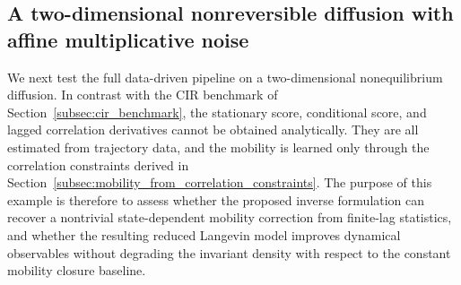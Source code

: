 \documentclass[11pt,twoside,fleqn]{article}
\begin{document}
\subsection{A two-dimensional nonreversible diffusion with affine multiplicative noise}
\label{subsec:affine_multiplicative_2d_results}

We next test the full data-driven pipeline on a two-dimensional nonequilibrium diffusion. In contrast with the CIR benchmark of Section~\ref{subsec:cir_benchmark}, the stationary score, conditional score, and lagged correlation derivatives cannot be obtained analytically. They are all estimated from trajectory data, and the mobility is learned only through the correlation constraints derived in Section~\ref{subsec:mobility_from_correlation_constraints}. The purpose of this example is therefore to assess whether the proposed inverse formulation can recover a nontrivial state-dependent mobility correction from finite-lag statistics, and whether the resulting reduced Langevin model improves dynamical observables without degrading the invariant density with respect to the constant mobility closure baseline.
\end{document}
